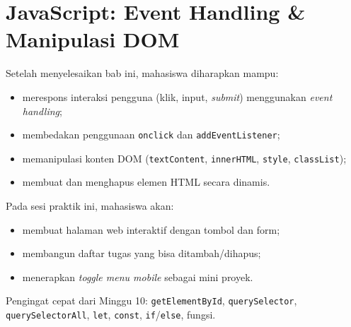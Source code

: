 
\chapter{JavaScript: Event Handling \& Manipulasi DOM}
\label{chap:mjs-11}

\begin{capaian}
Setelah menyelesaikan bab ini, mahasiswa diharapkan mampu:
\begin{itemize}
  \item merespons interaksi pengguna (klik, input, \emph{submit}) menggunakan \emph{event handling};
  \item membedakan penggunaan \texttt{onclick} dan \texttt{addEventListener};
  \item memanipulasi konten DOM (\texttt{textContent}, \texttt{innerHTML}, \texttt{style}, \texttt{classList});
  \item membuat dan menghapus elemen HTML secara dinamis.
\end{itemize}
\end{capaian}

\begin{tujuanpraktik}
Pada sesi praktik ini, mahasiswa akan:
\begin{itemize}
  \item membuat halaman web interaktif dengan tombol dan form;
  \item membangun daftar tugas yang bisa ditambah/dihapus;
  \item menerapkan \emph{toggle menu mobile} sebagai mini proyek.
\end{itemize}
\end{tujuanpraktik}

\begin{catatan}
Pengingat cepat dari Minggu 10: \texttt{getElementById}, \texttt{querySelector}, \texttt{querySelectorAll}, \texttt{let}, \texttt{const}, \texttt{if}/\texttt{else}, fungsi.
\end{catatan}

